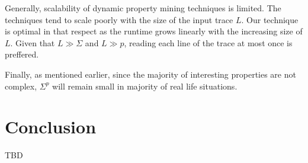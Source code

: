 \documentclass[]{sigplanconf}
\begin{document}
Generally, scalability of dynamic property mining techniques is limited.
The techniques tend to scale poorly with the size of the input trace $L$. Our technique is optimal in that respect as the runtime grows linearly with the increasing size of $L$. Given that $L \gg \Sigma$ and $L \gg p$, reading each line of the trace at most once is preffered.

Finally, as mentioned earlier, since the majority of interesting properties are not complex, $\Sigma^p$ will remain small in majority of real life situations.


\section{Conclusion}

TBD


%


\end{document}
